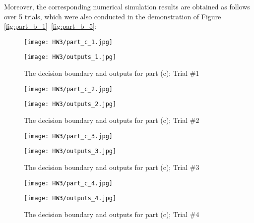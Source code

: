 \documentclass[11pt]{article}
\begin{document}
\indent Moreover, the corresponding numerical simulation results are obtained as follows over 5 trials, which were also conducted in the demonstration of Figure \ref{fig:part_b_1}--\ref{fig:part_b_5}:
\begin{figure}
    \begin{minipage}{0.48\textwidth}
        \centering
        \texttt{[image: HW3/part\_c\_1.jpg]}
    \end{minipage}
    \begin{minipage}{0.48\textwidth}
        \centering
        \texttt{[image: HW3/outputs\_1.jpg]}
    \end{minipage}
    \caption{The decision boundary and outputs for part (c); Trial \#1}
    \label{fig:part_c_1}
\end{figure}
\begin{figure}
    \begin{minipage}{0.48\textwidth}
        \centering
        \texttt{[image: HW3/part\_c\_2.jpg]}
    \end{minipage}
    \begin{minipage}{0.48\textwidth}
        \centering
        \texttt{[image: HW3/outputs\_2.jpg]}
    \end{minipage}
    \caption{The decision boundary and outputs for part (c); Trial \#2}
    \label{fig:part_c_2}
\end{figure}
\begin{figure}
    \begin{minipage}{0.48\textwidth}
        \centering
        \texttt{[image: HW3/part\_c\_3.jpg]}
    \end{minipage}
    \begin{minipage}{0.48\textwidth}
        \centering
        \texttt{[image: HW3/outputs\_3.jpg]}
    \end{minipage}
    \caption{The decision boundary and outputs for part (c); Trial \#3}
    \label{fig:part_c_3}
\end{figure}
\begin{figure}
    \begin{minipage}{0.48\textwidth}
        \centering
        \texttt{[image: HW3/part\_c\_4.jpg]}
    \end{minipage}
    \begin{minipage}{0.48\textwidth}
        \centering
        \texttt{[image: HW3/outputs\_4.jpg]}
    \end{minipage}
    \caption{The decision boundary and outputs for part (c); Trial \#4}
    \label{fig:part_c_4}
\end{figure}
\end{document}
